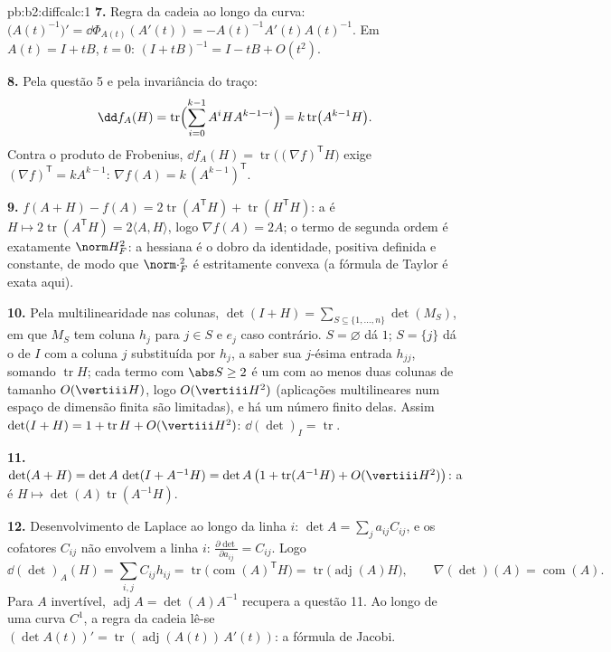 \begin{solution}{pb:b2:diffcalc:1}
\textbf{7.} Regra da cadeia ao longo da curva:
$\bigl(A(t)^{-1}\bigr)' = \dd\Phi_{A(t)}(A'(t)) =
-A(t)^{-1}A'(t)A(t)^{-1}$. Em $A(t) = I + tB$, $t = 0$: $(I +
tB)^{-1} = I - tB + O(t^2)$.

\textbf{8.} Pela questão 5 e pela invariância  do traço:
\[
\dd f_A(H) = \operatorname{tr}\Bigl(\sum_{i=0}^{k-1}
A^iHA^{k-1-i}\Bigr) = k\operatorname{tr}\bigl(A^{k-1}H\bigr) .
\]
Contra o produto de Frobenius, $\dd f_A(H) =
\operatorname{tr}\bigl((\nabla f)^{\mathsf T}H\bigr)$ exige
$(\nabla f)^{\mathsf T} = kA^{k-1}$: $\nabla f(A) =
k\,(A^{k-1})^{\mathsf T}$.

\textbf{9.} $f(A + H) - f(A) = 2\operatorname{tr}
(A^{\mathsf T}H) + \operatorname{tr}(H^{\mathsf T}H)$: a
 é $H \mapsto 2\operatorname{tr}(A^{\mathsf T}H) =
2\langle A, H\rangle$, logo $\nabla f(A) = 2A$; o termo de
segunda ordem é exatamente $\norm H_F^2$: a hessiana é o dobro da
 identidade, positiva definida e constante, de modo que
$\norm\cdot_F^2$ é estritamente convexa (a fórmula de Taylor é
exata aqui).

\textbf{10.} Pela multilinearidade nas colunas, $\det(I + H) =
\sum_{S\subseteq\{1,\dots,n\}}\det(M_S)$, em que $M_S$ tem coluna
$h_j$ para $j \in S$ e $e_j$ caso contrário. $S = \varnothing$
dá $1$; $S = \{j\}$ dá o  de $I$ com a coluna
$j$ substituída por $h_j$, a saber sua $j$-ésima entrada $h_{jj}$,
somando $\operatorname{tr}H$; cada termo com $\abs S \geq 2$
é um  com ao menos duas colunas de tamanho
$O(\vertiii H)$, logo $O(\vertiii H^2)$ (aplicações multilineares num espaço de
dimensão finita são limitadas), e há um número finito
delas. Assim $\det(I + H) = 1 + \operatorname{tr}H +
O(\vertiii H^2)$: $\dd(\det)_I = \operatorname{tr}$.

\textbf{11.} $\det(A + H) = \det A\,\det(I + A^{-1}H) =
\det A\,\bigl(1 + \operatorname{tr}(A^{-1}H) +
O(\vertiii H^2)\bigr)$: a  é $H \mapsto
\det(A)\operatorname{tr}(A^{-1}H)$.

\textbf{12.} Desenvolvimento de Laplace ao longo da linha $i$: $\det A =
\sum_j a_{ij}C_{ij}$, e os cofatores $C_{ij}$ não envolvem
a linha $i$: $\frac{\partial\det}{\partial a_{ij}} = C_{ij}$. Logo
\[
\dd(\det)_A(H) = \sum_{i,j}C_{ij}h_{ij}
= \operatorname{tr}\bigl(\operatorname{com}(A)^{\mathsf T}
H\bigr)
= \operatorname{tr}\bigl(\operatorname{adj}(A)H\bigr),
\qquad
\nabla(\det)(A) = \operatorname{com}(A) .
\]
Para $A$ invertível, $\operatorname{adj}A = \det(A)A^{-1}$
recupera a questão 11. Ao longo de uma curva $C^1$, a regra da cadeia lê-se
$(\det A(t))' = \operatorname{tr}(\operatorname{adj}
(A(t))\,A'(t))$: a fórmula de Jacobi.


\end{solution}

